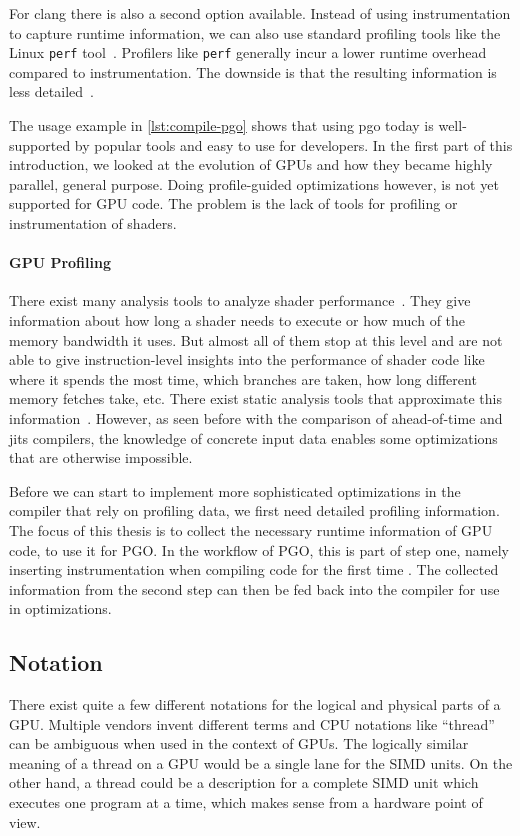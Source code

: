For clang there is also a second option available. Instead of using instrumentation to capture runtime information, we can also use standard profiling tools like the Linux \texttt{perf} tool~\cite{LinuxPerf}. Profilers like \texttt{perf} generally incur a lower runtime overhead compared to instrumentation. The downside is that the resulting information is less detailed~\cite{ClangManual}.

The usage example in \cref{lst:compile-pgo} shows that using \gls{pgo} today is well-supported by popular tools and easy to use for developers.
In the first part of this introduction, we looked at the evolution of GPUs and how they became highly parallel, general purpose. Doing profile-guided optimizations however, is not yet supported for GPU code. The problem is the lack of tools for profiling or instrumentation of shaders.

\paragraph{GPU Profiling} There exist many analysis tools to analyze shader performance~\cite{RenderDoc, NvidiaShaderPerf}. They give information about how long a shader needs to execute or how much of the memory bandwidth it uses. But almost all of them stop at this level and are not able to give instruction-level insights into the performance of shader code like where it spends the most time, which branches are taken, how long different memory fetches take, etc.
There exist static analysis tools that approximate this information~\cite{AMDShaderAnalyzer}. However, as seen before with the comparison of ahead-of-time and \glspl{jit} compilers, the knowledge of concrete input data enables some optimizations that are otherwise impossible.

Before we can start to implement more sophisticated optimizations in the compiler that rely on profiling data, we first need detailed profiling information. The focus of this thesis is to collect the necessary runtime information of GPU code, to use it for PGO. In the workflow of PGO, this is part of step one, namely inserting instrumentation when compiling code for the first time%
. The collected information from the second step can then be fed back into the compiler for use in optimizations.

\subsection{Notation}
\label{sub:notation}
There exist quite a few different notations for the logical and physical parts of a GPU. Multiple vendors invent different terms and CPU notations like \enquote{thread} can be ambiguous when used in the context of GPUs. The logically similar meaning of a thread on a GPU would be a single lane for the SIMD units. On the other hand, a thread could be a description for a complete SIMD unit which executes one program at a time, which makes sense from a hardware point of view.

